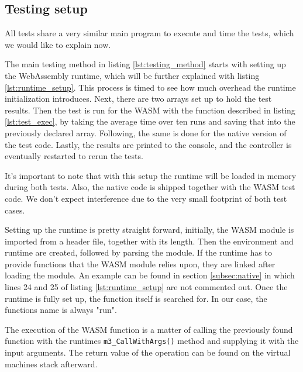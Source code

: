 \subsection{Testing setup}\label{subsec:testing_setup}

All tests share a very similar main program to execute and time the tests, which we would like to explain now.



The main testing method in listing \ref{lst:testing_method} starts with setting up the WebAssembly runtime, which will be further explained with listing \ref{lst:runtime_setup}. This process is timed to see how much overhead the runtime initialization introduces. Next, there are two arrays set up to hold the test results. Then the test is run for the WASM with the function described in listing \ref{lst:test_exec}, by taking the average time over ten runs and saving that into the previously declared array. Following, the same is done for the native version of the test code. Lastly, the results are printed to the console, and the controller is eventually restarted to rerun the tests.

It's important to note that with this setup the runtime will be loaded in memory during both tests. Also, the native code is shipped together with the WASM test code. We don't expect interference due to the very small footprint of both test cases.



Setting up the runtime is pretty straight forward, initially, the WASM module is imported from a header file, together with its length. Then the environment and runtime are created, followed by parsing the module. If the runtime has to provide functions that the WASM module relies upon, they are linked after loading the module. An example can be found in section \ref{subsec:native} in which lines 24 and 25 of listing \ref{lst:runtime_setup} are not commented out. Once the runtime is fully set up, the function itself is searched for. In our case, the functions name is always "run".



The execution of the WASM function is a matter of calling the previously found function with the runtimes \lstinline{m3_CallWithArgs()} method and supplying it with the input arguments. The return value of the operation can be found on the virtual machines stack afterward.

